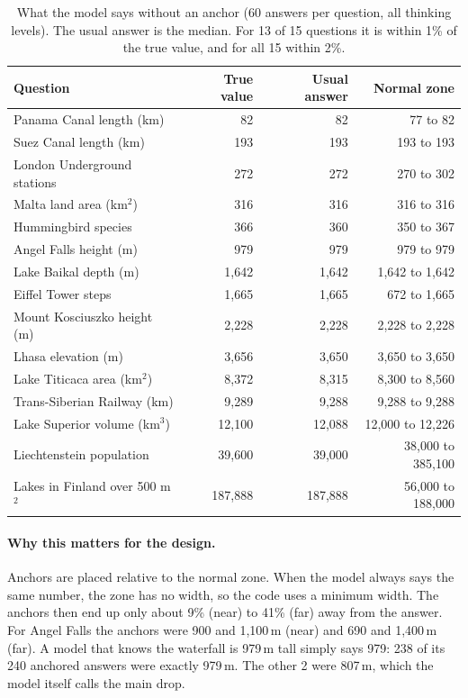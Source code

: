 \documentclass[11pt,a4paper]{article}
\begin{document}
\begin{table}[ht]
\centering\small
\begin{tabular}{lrrr}
\toprule
Question & True value & Usual answer & Normal zone \\
\midrule
Panama Canal length (km)          & 82       & 82        & 77 to 82 \\
Suez Canal length (km)            & 193      & 193       & 193 to 193 \\
London Underground stations       & 272      & 272       & 270 to 302 \\
Malta land area (km$^2$)          & 316      & 316       & 316 to 316 \\
Hummingbird species               & 366      & 360       & 350 to 367 \\
Angel Falls height (m)            & 979      & 979       & 979 to 979 \\
Lake Baikal depth (m)             & 1,642    & 1,642     & 1,642 to 1,642 \\
Eiffel Tower steps                & 1,665    & 1,665     & 672 to 1,665 \\
Mount Kosciuszko height (m)       & 2,228    & 2,228     & 2,228 to 2,228 \\
Lhasa elevation (m)               & 3,656    & 3,650     & 3,650 to 3,650 \\
Lake Titicaca area (km$^2$)       & 8,372    & 8,315     & 8,300 to 8,560 \\
Trans-Siberian Railway (km)       & 9,289    & 9,288     & 9,288 to 9,288 \\
Lake Superior volume (km$^3$)     & 12,100   & 12,088    & 12,000 to 12,226 \\
Liechtenstein population          & 39,600   & 39,000    & 38,000 to 385,100 \\
Lakes in Finland over 500 m$^2$   & 187,888  & 187,888   & 56,000 to 188,000 \\
\bottomrule
\end{tabular}
\caption{What the model says without an anchor (60 answers per question, all thinking levels). The usual answer is the median. For 13 of 15 questions it is within 1\% of the true value, and for all 15 within 2\%.}
\label{tab:knowledge}
\end{table}

\paragraph{Why this matters for the design.} Anchors are placed relative to the normal zone. When the model always says the same number, the zone has no width, so the code uses a minimum width. The anchors then end up only about 9\% (near) to 41\% (far) away from the answer. For Angel Falls the anchors were 900 and 1,100\,m (near) and 690 and 1,400\,m (far). A model that knows the waterfall is 979\,m tall simply says 979: 238 of its 240 anchored answers were exactly 979\,m. The other 2 were 807\,m, which the model itself calls the main drop.
\end{document}
